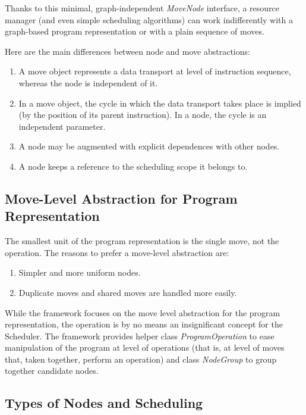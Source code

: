 \documentclass[a4paper,twoside]{tce}
\begin{document}
Thanks to this minimal, graph-independent \emph{MoveNode} interface, a
resource manager (and even simple scheduling algorithms) can work
indifferently with a graph-based program representation or with a plain
sequence of moves.

Here are the main differences between node and move abstractions:
\begin{enumerate}
\item %
  A move object represents a data transport at level of instruction
  sequence, whereas the node is independent of it.
\item %
  In a move object, the cycle in which the data transport takes place is
  implied (by the position of its parent instruction). In a node, the cycle
  is an independent parameter.
\item %
  A node may be augmented with explicit dependences with other nodes.
\item %
  A node keeps a reference to the scheduling scope it belongs to.
\end{enumerate}

\subsection{Move-Level Abstraction for Program Representation}

The smallest unit of the program representation is the single move, not the
operation. The reasons to prefer a move-level abstraction are:
\begin{enumerate}
\item%
 Simpler and more uniform nodes.
\item%
 Duplicate moves and shared moves are handled more easily.
\end{enumerate}

While the framework focuses on the move level abstraction for the program
representation, the operation is by no means an insignificant concept for
the Scheduler. The framework provides helper class \emph{ProgramOperation}
to ease manipulation of the program at level of operations (that is, at
level of moves that, taken together, perform an operation) and class
\emph{NodeGroup} to group together candidate nodes.

\subsection{Types of Nodes and Scheduling}
\label{ssec:node-types}
\end{document}
